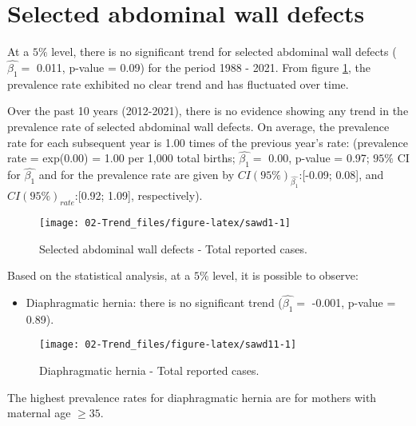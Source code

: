 \documentclass[
]{krantz}
\providecommand{\tightlist}{%
  \setlength{\itemsep}{0pt}\setlength{\parskip}{0pt}}
\begin{document}
\clearpage

\hypertarget{section312}{%
\section{Selected abdominal wall defects}\label{section312}}

At a \(5\%\) level, there is no significant trend for selected abdominal wall defects (\(\hat{\beta_{1}} =\) 0.011, p-value = 0.09) for the period 1988 - 2021. From figure \ref{fig:sawd1}, the prevalence rate exhibited no clear trend and has fluctuated over time.

Over the past 10 years (2012-2021), there is no evidence showing any trend in the prevalence rate of selected abdominal wall defects. On average, the prevalence rate for each subsequent year is 1.00 times of the previous year's rate: (prevalence rate = exp(0.00) = 1.00 per 1,000 total births; \(\hat{\beta_{1}} =\) 0.00, p-value = 0.97; \(95\%\) CI for \(\hat{\beta_{1}}\) and for the prevalence rate are given by \(CI(95\%)_{\hat{\beta_{1}}}\):{[}-0.09; 0.08{]}, and \(CI(95\%)_{rate}\):{[}0.92; 1.09{]}, respectively).

\begin{figure}[h]

{\centering \texttt{[image: 02-Trend\_files/figure-latex/sawd1-1]} 

}

\caption{Selected abdominal wall defects - Total reported cases.}\label{fig:sawd1}
\end{figure}

Based on the statistical analysis, at a \(5\%\) level, it is possible to observe:

\begin{itemize}
\tightlist
\item
  Diaphragmatic hernia: there is no significant trend (\(\hat{\beta_{1}} =\) -0.001, p-value = 0.89).
\end{itemize}

\begin{figure}[h]

{\centering \texttt{[image: 02-Trend\_files/figure-latex/sawd11-1]} 

}

\caption{Diaphragmatic hernia - Total reported cases.}\label{fig:sawd11}
\end{figure}

The highest prevalence rates for diaphragmatic hernia are for mothers with maternal age \(\ge 35\).
\end{document}
